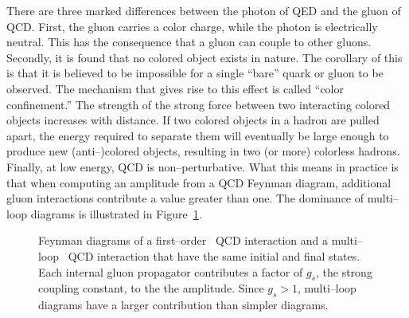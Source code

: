 There are three marked differences between the photon of QED and the gluon of
QCD\@.  First, the gluon carries a color charge, while the photon is
electrically neutral.  This has the consequence that a gluon can couple to other
gluons.  Secondly, it is found that no colored object exists in nature. The
corollary of this is that it is believed to be impossible for a single ``bare''
quark or gluon to be observed.  The mechanism that gives rise to this effect is
called ``color confinement.''  The strength of the strong force between two
interacting colored objects increases with distance.  If two colored objects in
a hadron are pulled apart, the energy required to separate them will eventually
be large enough to produce new (anti--)colored objects, resulting in two (or more)
colorless hadrons.  Finally, at low energy, QCD is non--perturbative.  What this
means in practice is that when computing an amplitude from a QCD Feynman
diagram, additional gluon interactions contribute a value greater than one.  The
dominance of multi--loop diagrams is illustrated in
Figure~\ref{fig:QCDFeynmanDiagrams}.
\begin{figure}
  \centering
   \label{fig:QCDFeynmanDiagrams}
  \caption[QCD Feynman Diagrams]{Feynman diagrams of a
  first--order~ QCD interaction and a
  multi--loop~ QCD interaction that have
  the same initial and final states.  Each internal gluon propagator contributes
  a factor of $g_s$, the strong coupling constant, to the the amplitude.  Since
  $g_s > 1$, multi--loop diagrams have a larger contribution than simpler
  diagrams.}
\end{figure}
